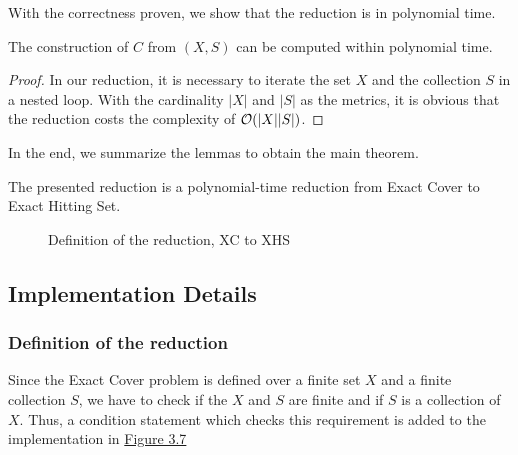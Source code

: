With the correctness proven, we show that the reduction is in polynomial time. 
\begin{lemma}
    The construction of $C$ from $(X, S)$ can be computed within polynomial time. 
\end{lemma}
\begin{proof}
    In our reduction, it is necessary to iterate the set $X$ and the collection $S$ in a nested loop. 
With the cardinality $|X|$ and $|S|$ as the metrics, it is obvious that the reduction costs the complexity of $\mathcal{O}({|X||S|})$.
\end{proof}
In the end, we summarize the lemmas to obtain the main theorem.
\begin{theorem}
    The presented reduction is a polynomial-time reduction from Exact Cover to Exact Hitting Set.
\end{theorem}

\begin{figure}[!ht]
    \caption{Definition of the reduction, XC to XHS}
    \label{fig:8}
\end{figure}

\subsection{Implementation Details}
\subsubsection{Definition of the reduction}
Since the Exact Cover problem is defined over a finite set $X$ and a finite collection $S$, we have to check if the $X$ and $S$ are finite and 
if $S$ is a collection of $X$. Thus, a condition statement which checks this requirement is added to the implementation in \hyperref[fig:8]{Figure 3.7}
